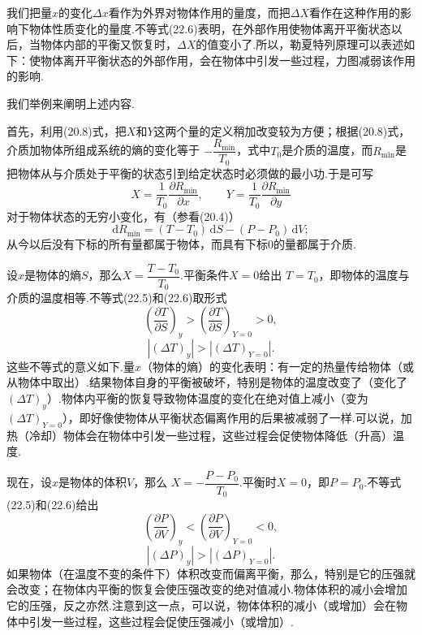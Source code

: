 我们把量$x$的变化$\Delta x$看作为外界对物体作用的量度，而把$\Delta X$看作在这种作用的影响下物体性质变化的量度.不等式(22.6)表明，在外部作用使物体离开平衡状态以后，当物体内部的平衡又恢复时，$\Delta X$的值变小了.所以，勒夏特列原理可以表述如下：使物体离开平衡状态的外部作用，会在物体中引发一些过程，力图减弱该作用的影响.

我们举例来阐明上述内容.

首先，利用(20.8)式，把$X$和$Y$这两个量的定义稍加改变较为方便；根据(20.8)式，介质加物体所组成系统的熵的变化等于
$-\dfrac{R_{\min}}{T_0}$，式中$T_0$是介质的温度，而$R_{\min}$是把物体从与介质处于平衡的状态引到给定状态时必须做的最小功.于是可写
\begin{equation}
  X=\frac{1}{T_0}\frac{\partial R_{\min}}{\partial x},\qquad
  Y=\frac{1}{T_0}\frac{\partial R_{\min}}{\partial y}
\end{equation}
对于物体状态的无穷小变化，有（参看(20.4)）
\begin{equation*}
  \mathrm{d}R_{\min}=(T-T_0)\,\mathrm{d}S-(P-P_0)\,\mathrm{d}V;
\end{equation*}
从今以后没有下标的所有量都属于物体，而具有下标0的量都属于介质.

设$x$是物体的熵$S$，那么$X=\dfrac{T-T_0}{T_0}$.平衡条件$X=0$给出
$T=T_0$，即物体的温度与介质的温度相等.不等式(22.5)和(22.6)取形式
\begin{equation}
  \left(\frac{\partial T}{\partial S}\right)_y
  >\left(\frac{\partial T}{\partial S}\right)_{Y=0}>0,
\end{equation}
\begin{equation}
  |(\Delta T)_y|>|(\Delta T)_{Y=0}|.
\end{equation}
这些不等式的意义如下.量$x$（物体的熵）的变化表明：有一定的热量传给物体（或从物体中取出）.结果物体自身的平衡被破坏，特别是物体的温度改变了（变化了$(\Delta T)_y$）.物体内平衡的恢复导致物体温度的变化在绝对值上减小（变为$(\Delta T)_{Y=0}$），即好像使物体从平衡状态偏离作用的后果被减弱了一样.可以说，加热（冷却）物体会在物体中引发一些过程，这些过程会促使物体降低（升高）温度.

现在，设$x$是物体的体积$V$，那么
$X=-\dfrac{P-P_0}{T_0}$.平衡时$X=0$，即$P=P_0$.不等式(22.5)和(22.6)给出
\begin{equation}
  \left(\frac{\partial P}{\partial V}\right)_y
  <\left(\frac{\partial P}{\partial V}\right)_{Y=0}<0,
\end{equation}
\begin{equation}
  |(\Delta P)_y|>|(\Delta P)_{Y=0}|.
\end{equation}
如果物体（在温度不变的条件下）体积改变而偏离平衡，那么，特别是它的压强就会改变；在物体内平衡的恢复会使压强改变的绝对值减小.物体体积的减小会增加它的压强，反之亦然.注意到这一点，可以说，物体体积的减小（或增加）会在物体中引发一些过程，这些过程会促使压强减小（或增加）.

